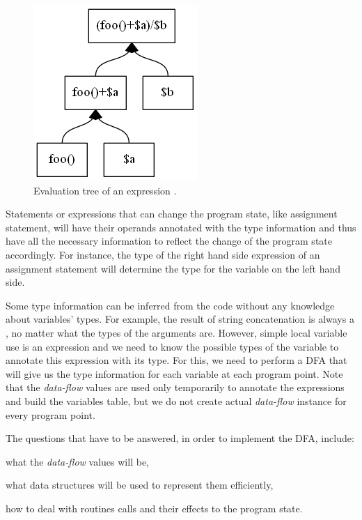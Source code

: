         \begin{figure}[h]  
          \centering        
          \includegraphics[scale=0.5]{graphs/evaltree.png}
          \caption{Evaluation tree of an expression .\label{evaltree}}    
        \end{figure}        
        
        Statements or expressions that can change the program state, 
        like assignment statement, will have their operands 
        annotated with the type information and thus have all 
        the necessary information to reflect the change of 
        the program state accordingly. For instance, 
        the type of the right hand side expression of an assignment 
        statement will determine the type for the variable 
        on the left hand side.
        
        Some type information can be inferred from the code without 
        any knowledge about variables' types. For example, the result 
        of string concatenation is always a , no matter 
        what the types of the arguments are. However, simple local 
        variable use is an expression and we need to know the possible 
        types of the variable to annotate this expression 
        with its type. For this, we need to perform a DFA that will 
        give us the type information for each variable at each program 
        point. Note that the \emph{data-flow} values are used only 
        temporarily to annotate the expressions and build the variables 
        table, but we do not create actual \emph{data-flow} instance 
        for every program point.
        
        The questions that have to be answered, in order to 
        implement the DFA, include:
        
        \begin{itemize*}
            \item what the \emph{data-flow} values will be, 
            \item what data structures will be used to represent them efficiently, 
            \item how to deal with routines calls and their effects to the program state.
        \end{itemize*}
        
